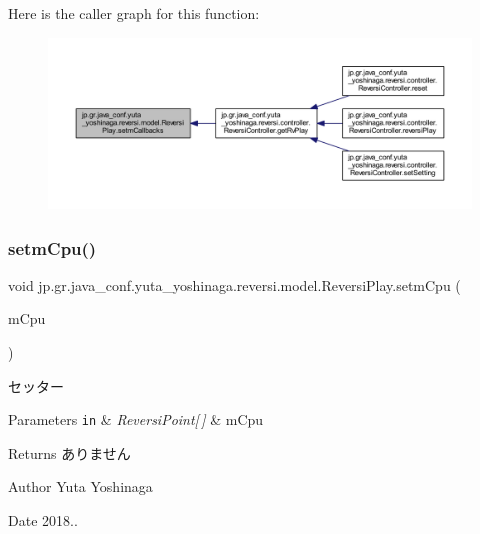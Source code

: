 Here is the caller graph for this function\+:
\nopagebreak
\begin{figure}[H]
\begin{center}
\leavevmode
\includegraphics[width=350pt]{classjp_1_1gr_1_1java__conf_1_1yuta__yoshinaga_1_1reversi_1_1model_1_1_reversi_play_a7d60f70e06930069f315cc1d50c502b6_icgraph}
\end{center}
\end{figure}
\mbox{\label{classjp_1_1gr_1_1java__conf_1_1yuta__yoshinaga_1_1reversi_1_1model_1_1_reversi_play_a2a3db559dc64c79e41e7b24fbf852faf}} 
\subsubsection{\texorpdfstring{setm\+Cpu()}{setmCpu()}}
{\footnotesize\ttfamily void jp.\+gr.\+java\+\_\+conf.\+yuta\+\_\+yoshinaga.\+reversi.\+model.\+Reversi\+Play.\+setm\+Cpu (\begin{DoxyParamCaption}\item[{\hyperlink{classjp_1_1gr_1_1java__conf_1_1yuta__yoshinaga_1_1reversi_1_1model_1_1_reversi_point}{Reversi\+Point} \mbox{[}$\,$\mbox{]}}]{m\+Cpu }\end{DoxyParamCaption})}



セッター 


\begin{DoxyParams}[1]{Parameters}
\mbox{\tt in}  & {\em Reversi\+Point\mbox{[}$\,$\mbox{]}} & m\+Cpu \\
\hline
\end{DoxyParams}
\begin{DoxyReturn}{Returns}
ありません 
\end{DoxyReturn}
\begin{DoxyAuthor}{Author}
Yuta Yoshinaga 
\end{DoxyAuthor}
\begin{DoxyDate}{Date}
2018.. 
\end{DoxyDate}


